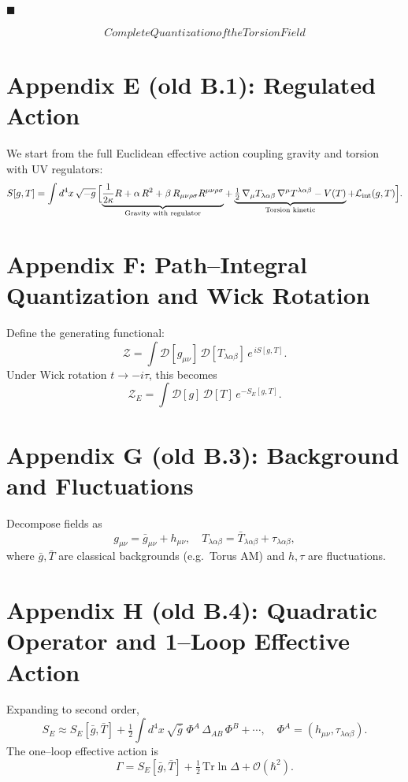 \documentclass{article}
\newcommand{\Tr}{\mathrm{Tr}}
\begin{document}
\hfill $\blacksquare$





\textbf{
\[{Complete Quantization of the Torsion Field}
\label{app:full_quantization}\]
}
\section*{Appendix E (old B.1): Regulated Action}

We start from the full Euclidean effective action coupling gravity and torsion with UV regulators:
\[
  S[g,T]
  = \int d^4x\,\sqrt{-g}\,
  \Bigl[
    \underbrace{\frac{1}{2\kappa}R
    +\alpha\,R^2
    +\beta\,R_{\mu\nu\rho\sigma}R^{\mu\nu\rho\sigma}}_{\text{Gravity with regulator}}
    +\underbrace{\tfrac12\,\nabla_\mu T_{\lambda\alpha\beta}\,
    \nabla^\mu T^{\lambda\alpha\beta}
    -V(T)}_{\text{Torsion kinetic}}
    +\mathcal{L}_{\rm int}(g,T)
  \Bigr].
\]




\section*{Appendix F: Path–Integral Quantization and Wick Rotation}

Define the generating functional:
\[
  \mathcal Z
  = \int \mathcal D[g_{\mu\nu}]\,\mathcal D[T_{\lambda\alpha\beta}]\,
    e^{\,iS[g,T]}.
\]
Under Wick rotation \(t\to -i\tau\), this becomes
\[
  \mathcal Z_E
  = \int \mathcal D[g]\,\mathcal D[T]\,e^{-S_E[g,T]}.
\]



\section*{Appendix G (old B.3): Background and Fluctuations}

Decompose fields as
\[
  g_{\mu\nu} = \bar g_{\mu\nu} + h_{\mu\nu},
  \quad
  T_{\lambda\alpha\beta} = \bar T_{\lambda\alpha\beta} + \tau_{\lambda\alpha\beta},
\]
where \(\bar g,\bar T\) are classical backgrounds (e.g.\ Torus AM) and \(h,\tau\) are fluctuations.



\section*{Appendix H (old B.4): Quadratic Operator and 1–Loop Effective Action}

Expanding to second order,
\[
  S_E \approx S_E[\bar g,\bar T]
  + \tfrac12\!\int d^4x\,\sqrt{\bar g}\;
    \Phi^A\,\Delta_{AB}\,\Phi^B + \cdots,
  \quad
  \Phi^A=(h_{\mu\nu},\tau_{\lambda\alpha\beta}).
\]
The one–loop effective action is
\[
  \Gamma
  = S_E[\bar g,\bar T]
  + \tfrac12\,\Tr\ln\Delta
  + \mathcal O(\hbar^2).
\]
\end{document}
